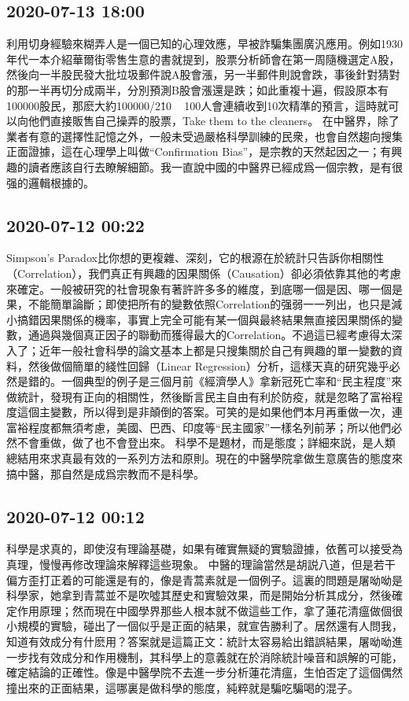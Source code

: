\documentclass[twocolumn]{ctexart}
\begin{document}
\subsection*{2020-07-13 18:00}

利用切身經驗來糊弄人是一個已知的心理效應，早被詐騙集團廣汎應用。例如1930年代一本介紹華爾街零售生意的書就提到，股票分析師會在第一周隨機選定A股，然後向一半股民發大批垃圾郵件說A股會漲，另一半郵件則說會跌，事後針對猜對的那一半再切分成兩半，分別預測B股會漲還是跌；如此重複十遍，假設原本有100000股民，那麽大約100000/2\^10 ~ 100人會連續收到10次精準的預言，這時就可以向他們直接販售自己操弄的股票，Take them to the cleaners。
在中醫界，除了業者有意的選擇性記憶之外，一般未受過嚴格科學訓練的民衆，也會自然趨向搜集正面證據，這在心理學上叫做“Confirmation Bias”，是宗教的天然起因之一；有興趣的讀者應該自行去瞭解細節。我一直說中國的中醫界已經成爲一個宗教，是有很强的邏輯根據的。
\subsection*{2020-07-12 00:22}

Simpson's Paradox比你想的更複雜、深刻，它的根源在於統計只告訴你相關性（Correlation），我們真正有興趣的因果關係（Causation）卻必須依靠其他的考慮來確定。一般被研究的社會現象有著許許多多的維度，到底哪一個是因、哪一個是果，不能簡單論斷；即使把所有的變數依照Correlation的强弱一一列出，也只是減小搞錯因果關係的機率，事實上完全可能有某一個與最終結果無直接因果關係的變數，通過與幾個真正因子的聯動而獲得最大的Correlation。不過這已經考慮得太深入了；近年一般社會科學的論文基本上都是只搜集關於自己有興趣的單一變數的資料，然後做個簡單的綫性回歸（Linear Regression）分析，這樣天真的研究幾乎必然是錯的。一個典型的例子是三個月前《經濟學人》拿新冠死亡率和“民主程度”來做統計，發現有正向的相關性，然後斷言民主自由有利於防疫，就是忽略了富裕程度這個主變數，所以得到是非顛倒的答案。可笑的是如果他們本月再重做一次，連富裕程度都無須考慮，美國、巴西、印度等“民主國家”一樣名列前茅；所以他們必然不會重做，做了也不會登出來。
科學不是題材，而是態度；詳細來説，是人類總結用來求真最有效的一系列方法和原則。現在的中醫學院拿做生意廣告的態度來搞中醫，那自然是成爲宗教而不是科學。
\subsection*{2020-07-12 00:12}

科學是求真的，即使沒有理論基礎，如果有確實無疑的實驗證據，依舊可以接受為真理，慢慢再修改理論來解釋這些現象。
中醫的理論當然是胡説八道，但是若干偏方歪打正着的可能還是有的，像是青蒿素就是一個例子。這裏的問題是屠呦呦是科學家，她拿到青蒿並不是吹噓其歷史和實驗效果，而是開始分析其成分，然後確定作用原理；然而現在中國學界那些人根本就不做這些工作，拿了蓮花清瘟做個很小規模的實驗，碰出了一個似乎是正面的結果，就宣告勝利了。居然還有人問我，知道有效成分有什麽用？答案就是這篇正文：統計太容易給出錯誤結果，屠呦呦進一步找有效成分和作用機制，其科學上的意義就在於消除統計噪音和誤解的可能，確定結論的正確性。像是中醫學院不去進一步分析蓮花清瘟，生怕否定了這個偶然撞出來的正面結果，這哪裏是做科學的態度，純粹就是騙吃騙喝的混子。
\end{document}
